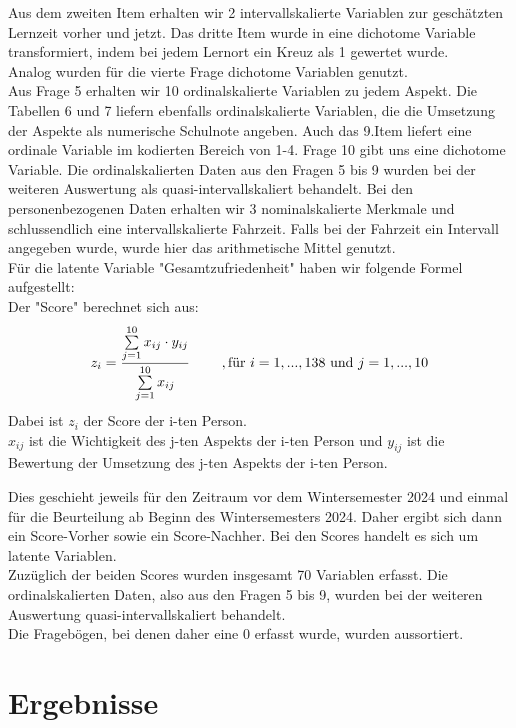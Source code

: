 \documentclass[11pt, a4paper]{article}
\begin{document}
Aus dem zweiten Item erhalten wir 2 intervallskalierte Variablen zur geschätzten Lernzeit vorher und jetzt. 
Das dritte Item wurde in eine dichotome Variable transformiert, indem bei jedem Lernort ein Kreuz als 1 gewertet wurde.\\
Analog wurden für die vierte Frage dichotome Variablen genutzt.\\
Aus Frage 5 erhalten wir 10 ordinalskalierte Variablen zu jedem Aspekt.
Die Tabellen 6 und 7 liefern ebenfalls ordinalskalierte Variablen, die die Umsetzung der Aspekte als numerische Schulnote angeben.
Auch das 9.Item liefert eine ordinale Variable im kodierten Bereich von 1-4.
Frage 10 gibt uns eine dichotome Variable.
Die ordinalskalierten Daten aus den Fragen 5 bis 9 wurden bei der weiteren Auswertung als quasi-intervallskaliert behandelt.
Bei den personenbezogenen Daten erhalten wir 3 nominalskalierte Merkmale und schlussendlich eine intervallskalierte Fahrzeit.
Falls bei der Fahrzeit ein Intervall angegeben wurde, wurde hier das arithmetische Mittel genutzt. \\


Für die latente Variable "Gesamtzufriedenheit" haben wir folgende Formel aufgestellt:  \\
Der "Score" berechnet sich aus:
\begin{equation*}
	z_i = \frac{\sum\limits_{j=1}^{10}x_{ij}\cdot  y_{ij}}{\sum\limits_{j=1}^{10}x_{ij}} \hspace{0.8cm} , \text{für} \ 
	i=1,...,138\  \text{und} \ j=1,...,10
\end{equation*} 
Dabei ist $z_i$ der Score der i-ten Person. \\
$x_{ij}$ ist die Wichtigkeit des j-ten Aspekts der i-ten Person und
$y_{ij}$ ist die Bewertung der Umsetzung des j-ten Aspekts der i-ten Person.


Dies geschieht jeweils für den Zeitraum vor dem Wintersemester 2024 und einmal für die Beurteilung ab Beginn des Wintersemesters 2024. Daher ergibt sich dann ein Score-Vorher sowie ein Score-Nachher. Bei den Scores handelt es sich um latente Variablen.
\\
Zuzüglich der beiden Scores wurden insgesamt 70 Variablen erfasst.
Die ordinalskalierten Daten, also aus den Fragen 5 bis 9, wurden bei der weiteren Auswertung quasi-intervallskaliert behandelt.
\\
Die Fragebögen, bei denen daher eine 0 erfasst wurde, wurden aussortiert.


\newpage
\section{Ergebnisse}
\end{document}
